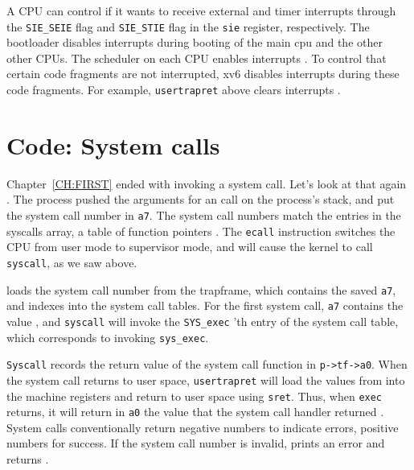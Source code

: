 A CPU can control if it wants to receive external and timer
interrupts through the \lstinline{SIE_SEIE}
 flag and \lstinline{SIE_STIE}
 flag in the \texttt{sie}
register, respectively.  The bootloader disables interrupts during
booting of the main cpu and the other other CPUs.  The scheduler on
each CPU enables interrupts .  To
control that certain code fragments are not interrupted, xv6 disables
interrupts during these code fragments.  For example,
\lstinline{usertrapret} above clears interrupts
.

\section{Code: System calls}

Chapter~\ref{CH:FIRST} ended with 
invoking a system call.
Let's look at that again
.
The process pushed the arguments
for an 
call on the process's stack, and put the
system call number in
\texttt{a7}.
The system call numbers match the entries in the syscalls array,
a table of function pointers
.
The \lstinline{ecall} instruction
switches the CPU from user mode to supervisor mode, and will
cause the kernel to call \lstinline{syscall}, as we saw above.

loads the system call number from the trapframe, which
contains the saved
\texttt{a7},
and indexes into the system call tables.
For the first system call, 
\texttt{a7}
contains the value 
,
and
\lstinline{syscall}
will invoke the 
\lstinline{SYS_exec} 'th 
entry of the system call table, which corresponds to invoking
\lstinline{sys_exec}.

\lstinline{Syscall}
records the return value of the system call function in
\lstinline{p->tf->a0}.
When the system call returns to user space,
\lstinline{usertrapret}
will load the values
from
into the machine registers
and return to user space
using
\lstinline{sret}.
Thus, when 
\lstinline{exec}
returns, it will return in \lstinline{a0} the value
that the system call handler returned
.
System calls conventionally return negative numbers to indicate
errors, positive numbers for success.
If the system call number is invalid,
prints an error and returns .

